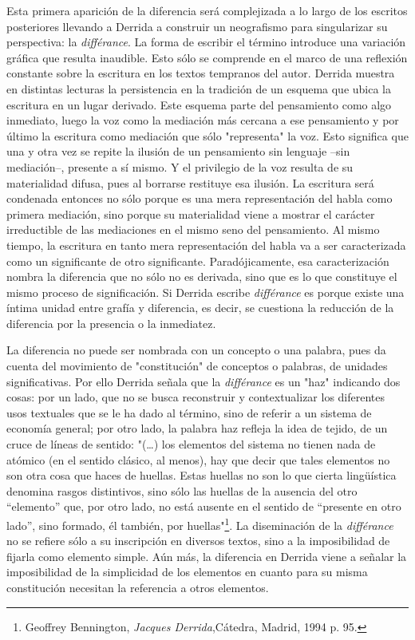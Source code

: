 \documentclass{book}
\begin{document}
Esta primera aparición de la diferencia será complejizada a lo largo de
los escritos posteriores llevando a Derrida a construir un neografismo
para singularizar su perspectiva: la \emph{différance}. La forma de
escribir el término introduce una variación gráfica que resulta
inaudible. Esto sólo se comprende en el marco de una reflexión constante
sobre la escritura en los textos tempranos del autor. Derrida muestra en
distintas lecturas la persistencia en la tradición de un esquema que
ubica la escritura en un lugar derivado. Este esquema parte del
pensamiento como algo inmediato, luego la voz como la mediación más
cercana a ese pensamiento y por último la escritura como mediación que
sólo "representa" la voz. Esto significa que una y otra vez se repite la
ilusión de un pensamiento sin lenguaje --sin mediación--, presente a sí
mismo. Y el privilegio de la voz resulta de su materialidad difusa, pues
al borrarse restituye esa ilusión. La escritura será condenada entonces
no sólo porque es una mera representación del habla como primera
mediación, sino porque su materialidad viene a mostrar el carácter
irreductible de las mediaciones en el mismo seno del pensamiento. Al
mismo tiempo, la escritura en tanto mera representación del habla va a
ser caracterizada como un significante de otro significante.
Paradójicamente, esa caracterización nombra la diferencia que no sólo no
es derivada, sino que es lo que constituye el mismo proceso de
significación. Si Derrida escribe \emph{différance} es porque existe una
íntima unidad entre grafía y diferencia, es decir, se cuestiona la
reducción de la diferencia por la presencia o la inmediatez.

La diferencia no puede ser nombrada con un concepto o una palabra, pues
da cuenta del movimiento de "constitución" de conceptos o palabras, de
unidades significativas. Por ello Derrida señala que la
\emph{différance} es un "haz" indicando dos cosas: por un lado, que no
se busca reconstruir y contextualizar los diferentes usos textuales que
se le ha dado al término, sino de referir a un sistema de economía
general; por otro lado, la palabra haz refleja la idea de tejido, de un
cruce de líneas de sentido: "(\dots) los elementos del sistema no
tienen nada de atómico (en el sentido clásico, al menos), hay que decir
que tales elementos no son otra cosa que haces de huellas. Estas huellas
no son lo que cierta lingüística denomina rasgos distintivos, sino sólo
las huellas de la ausencia del otro ``elemento'' que, por otro lado, no
está ausente en el sentido de ``presente en otro lado'', sino formado,
él también, por huellas"\footnote{Geoffrey Bennington, \emph{Jacques
  Derrida},Cátedra, Madrid, 1994 p. 95.}. La diseminación de la
\emph{différance} no se refiere sólo a su inscripción en diversos
textos, sino a la imposibilidad de fijarla como elemento simple. Aún
más, la diferencia en Derrida viene a señalar la imposibilidad de la
simplicidad de los elementos en cuanto para su misma constitución
necesitan la referencia a otros elementos.
\end{document}
